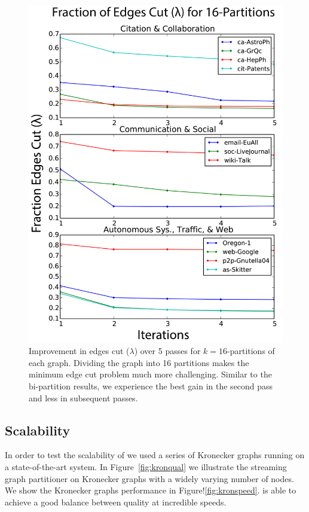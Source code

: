 {\begin{figure}[t!]
\centering
\includegraphics[width=0.9\columnwidth] {figures/real_k16_lambda.pdf}
\caption[Caption for]{Improvement in edges cut ($\lambda$) over 5 passes for $k=16$-partitions of each graph. Dividing the graph into 16 partitions makes the minimum edge cut problem much more challenging. Similar to the bi-partition results, we experience the best gain in the second pass and less in subsequent passes.}
\label{fig:k16_lambda}
\end{figure}


\subsection{Scalability}
In order to test the scalability of \ourmethod we used a series of Kronecker graphs running on a state-of-the-art system.
In Figure~\ref{fig:kronqual} we illustrate the streaming graph partitioner on Kronecker graphs with a widely varying number of nodes.
We show the Kronecker graphs performance in Figure!\ref{fig:kronspeed}. 
\ourmethod is able to achieve a good balance between quality at incredible speeds.

}
